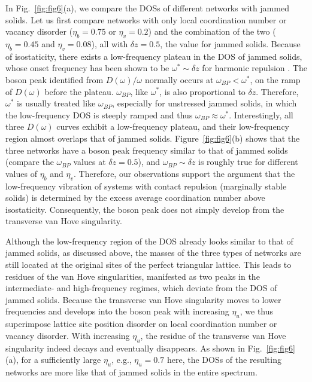 \documentclass[twocolumn,printnumbers,amsmath,amssymb,prl,verbatim]{revtex4}
\begin{document}
In Fig.~\ref{fig:fig6}(a), we compare the DOSs of different networks with jammed solids. Let us first compare networks with only local coordination number or vacancy disorder ($\eta_b=0.75$ or $\eta_v=0.2$) and the combination of the two ($\eta_b=0.45$ and $\eta_v=0.08$), all with $\delta z =0.5$, the value for jammed solids. Because of isostaticity, there exists a low-frequency plateau in the DOS of jammed solids, whose onset frequency has been shown to be $\omega^* \sim \delta z$ for harmonic repulsion \cite{silbert,wyart1}. The boson peak identified from $D(\omega)/\omega$ normally occurs at $\omega_{BP}<\omega^*$, on the ramp of $D(\omega)$ before the plateau. $\omega_{BP}$, like $\omega^*$, is also proportional to $\delta z$. Therefore, $\omega^*$ is usually treated like $\omega_{BP}$, especially for unstressed jammed solids, in which the low-frequency DOS is steeply ramped and thus $\omega_{BP}\approx \omega^*$. Interestingly, all three $D(\omega)$ curves exhibit a low-frequency plateau, and their low-frequency region almost overlaps that of jammed solids. Figure~\ref{fig:fig6}(b) shows that the three networks have a boson peak frequency similar to that of jammed solids (compare the $\omega_{BP}$ values at $\delta z =0.5$), and $\omega_{BP}\sim \delta z$ is roughly true for different values of $\eta_b$ and $\eta_v$. Therefore, our observations support the argument that the low-frequency vibration of systems with contact repulsion (marginally stable solids) is determined by the excess average coordination number above isostaticity. Consequently, the boson peak does not simply develop from the transverse van Hove singularity.

Although the low-frequency region of the DOS already looks similar to that of jammed solids, as discussed above, the masses of the three types of networks are still located at the original sites of the perfect triangular lattice. This leads to residues of the van Hove singularities, manifested as two peaks in the intermediate- and high-frequency regimes, which deviate from the DOS of jammed solids. Because the transverse van Hove singularity moves to lower frequencies and develops into the boson peak with increasing $\eta_u$, we thus superimpose lattice site position disorder on local coordination number or vacancy disorder. With increasing $\eta_u$, the residue of the transverse van Hove singularity indeed decays and eventually disappears. As shown in Fig.~\ref{fig:fig6}(a), for a sufficiently large $\eta_u$, e.g., $\eta_u=0.7$ here, the DOSs of the resulting networks are more like that of jammed solids in the entire spectrum.
\end{document}

